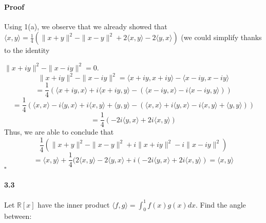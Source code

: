 \documentclass[letterpaper,12pt]{article}
\theoremstyle{definition}
\begin{document}
\paragraph{Proof} Using 1(a), we observe that we already showed that  
$\langle x , y \rangle = \frac{1}{4} ( \| x + y\|^2 - \| x - y\|^2 + 2\langle x , y \rangle - 2\langle y , x \rangle) $ (we could simplify thanks to the identity


$\| x + iy\|^2 - \| x - iy\|^2 = 0$.
$$\| x + iy\|^2 - \| x - iy\|^2 = \langle x + iy , x + iy \rangle - \langle x - iy , x - iy \rangle $$
	$$ = \frac{1}{4} (\langle x + iy , x \rangle + i\langle x + iy , y \rangle - (\langle x - iy , x \rangle -i \langle x - iy , y \rangle))$$
   	$$= \frac{1}{4} (\langle x , x \rangle -i \langle y , x \rangle + i\langle x , y \rangle + \langle y , y \rangle - (\langle x , x \rangle + i\langle y , x \rangle - i\langle x, y \rangle  + \langle y , y \rangle))$$
    $$ = \frac{1}{4} (-2i \langle y , x \rangle + 2i\langle x , y \rangle)  $$ 
   	Thus, we are able to conclude that 
     $$\frac{1}{4} ( \| x + y\|^2 - \| x - y\|^2 + i\| x + iy\|^2 -i \| x - iy\|^2) $$
     $$= \langle x , y \rangle + \frac{1}{4} (2\langle x , y \rangle - 2\langle y , x\rangle + i(-2i \langle y , x \rangle + 2i\langle x , y \rangle) = \langle x , y \rangle $$ $\square$
   
   
   
\paragraph{3.3} Let  $\mathds{R}[x]$ have the inner product $ \langle f , g  \rangle  = \int_0^1 f(x) g(x) dx$. Find the angle between:
	
\end{document}
